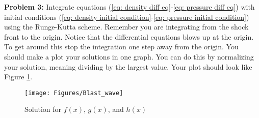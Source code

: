 \documentclass{article}
\begin{document}
\bigskip
\noindent
\textbf{Problem 3:} Integrate equations (\ref{eq: density diff eq}-\ref{eq: pressure diff eq}) with initial conditions (\ref{eq: density initial condition}-\ref{eq: pressure initial condition}) using the Runge-Kutta scheme. Remember you are integrating from the shock front to the origin. Notice that the differential equations blows up at the origin. To get around this stop the integration one step away from the origin. You should make a plot your solutions in one graph. You can do this by normalizing your solution, meaning dividing by the largest value. Your plot should look like Figure \ref{fig: Blast wave solution}.
\begin{figure}[h!]
\begin{center}
\texttt{[image: Figures/Blast\_wave]}
\end{center}
\caption{Solution for $f(x)$, $g(x)$, and $h(x)$}
\label{fig: Blast wave solution}
\end{figure}
\end{document}
